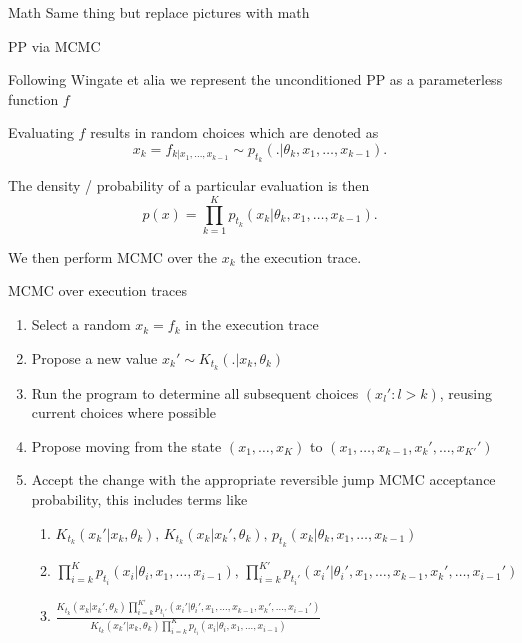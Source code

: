 \begin{frame}{Math}
Same thing but replace pictures with math
\end{frame}

\begin{frame}{PP via MCMC}
  \begin{block}{}
    Following Wingate et alia we represent the unconditioned PP as a parameterless function $f$
    \newline
    
    Evaluating $f$ results in random choices which are denoted as
    \begin{equation*}
      x_k = f_{k|x_1,\ldots,x_{k-1}} \sim p_{t_k}(.|\theta_{k},x_1,\ldots,x_{k-1}).
    \end{equation*}
    
    The density / probability of a particular evaluation is then
    \begin{equation*}
      p(x) = \prod_{k=1}^K p_{t_k}(x_k|\theta_{k},x_1,\ldots,x_{k-1}).
    \end{equation*}
    
    We then perform MCMC over the $x_k$ \ie the execution trace.
    
  \end{block}
\end{frame}

\begin{frame}{MCMC over execution traces}
  \begin{enumerate}
    \item Select a random $x_k = f_k$ in the execution trace
    \item Propose a new value $x_k' \sim K_{t_k}(.|x_k,\theta_k)$
    \item Run the program to determine all subsequent choices $(x_l' : l > k)$, reusing current choices where possible
    \item Propose moving from the state $(x_1,\ldots,x_K)$ to $(x_1,\ldots,x_{k-1},x_k',\ldots,x_{K'}')$
    \item Accept the change with the appropriate reversible jump MCMC acceptance probability, this includes terms like
    \begin{enumerate}
      \item $K_{t_k}(x_k'|x_k,\theta_k),\,K_{t_k}(x_k|x_k',\theta_k),\,p_{t_k}(x_k|\theta_{k},x_1,\ldots,x_{k-1})$
      \item $\prod_{i=k}^K p_{t_i}(x_i|\theta_{i},x_1,\ldots,x_{i-1}),\,\prod_{i=k}^{K'} p_{t_i'}(x_i'|\theta_{i}',x_1,\ldots,x_{k-1},x_k',\ldots,x_{i-1}')$
      \item \ie $\frac{K_{t_k}(x_k|x_k',\theta_k)\prod_{i=k}^{K'} p_{t_i'}(x_i'|\theta_{i}',x_1,\ldots,x_{k-1},x_k',\ldots,x_{i-1}')}{K_{t_k}(x_k'|x_k,\theta_k)\prod_{i=k}^K p_{t_i}(x_i|\theta_{i},x_1,\ldots,x_{i-1})}$
    \end{enumerate}
  \end{enumerate}
\end{frame}

